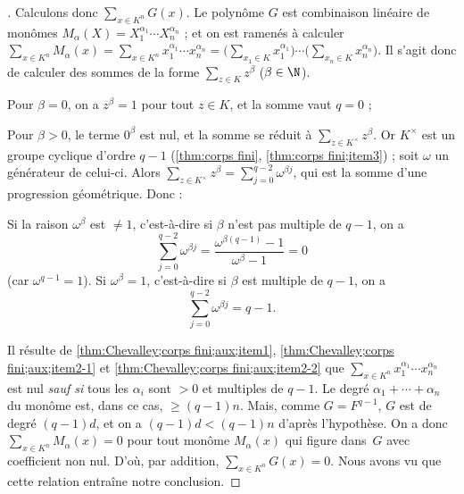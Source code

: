 \documentclass[11pt, useosf,
  title in boldface,
  theorem in new line,
  theorem numbering = section,
  number theorems separately,
]{simplivre}
\begin{document}
\begin{proof}[{Démonstration \cref[de]{thm:Chevalley;corps fini}}]
        Calculons donc \( \sum_{x \in K^n} G(x) \). Le polynôme \( G \) est combinaison linéaire de monômes \( M_{\alpha}(X) = X_1^{\alpha_1} \cdots X_n^{\alpha_n} \) ; et on est ramenés à calculer \( \sum_{x \in K^n} M_{\alpha}(x) = \sum_{x \in K^n} x_1^{\alpha_1} \cdots x_n^{\alpha_n} = \bigl(\sum_{x_1 \in K} x_1^{\alpha_1}\bigr) \cdots \bigl(\sum_{x_n \in K} x_n^{\alpha_n}\bigr) \). Il s'agit donc de calculer des sommes de la forme \( \sum_{z \in K} z^{\beta} \) (\( \beta \in \N \)).
        \begin{enumerate-alph}
            \item \label{thm:Chevalley;corps fini;aux;item1} Pour \( \beta = 0 \), on a \( z^{\beta} = 1 \) pour tout \( z \in K \), et la somme vaut \( q = 0 \) ;
            \item \label{thm:Chevalley;corps fini;aux;item2} Pour \( \beta > 0 \), le terme \( 0^{\beta} \) est nul, et la somme se réduit à \( \sum_{z \in K^\times} z^{\beta} \). Or \( K^\times \) est un groupe cyclique d'ordre \( q-1 \) (\cref{thm:corps fini}, \ref{thm:corps fini;item3}) ; soit \( \omega \) un générateur de celui-ci. Alors \( \sum_{z \in K^\times} z^{\beta} = \sum_{j=0}^{q-2} {\omega}^{\beta j} \), qui est la somme d'une progression géométrique. Donc :
            \begin{enumerate}
                 \label{thm:Chevalley;corps fini;aux;item2-1} Si la raison \( \omega^{\beta} \) est \( \neq 1 \), c'est-à-dire si \( \beta \) n'est pas multiple de \( q-1 \), on a
                \[
                    \sum_{j=0}^{q-2} {\omega}^{\beta j} = \frac{{\omega}^{\beta (q-1)}-1}{{\omega}^{\beta}-1} = 0
                \]
                (car \( \omega^{q-1} = 1 \)).
                 \label{thm:Chevalley;corps fini;aux;item2-2} Si \( \omega^{\beta} = 1 \), c'est-à-dire si \( \beta \) est multiple de \( q-1 \), on a
                \[
                    \sum_{j=0}^{q-2} {\omega}^{\beta j} = q-1.
                \]
            \end{enumerate}
        \end{enumerate-alph}
        Il résulte de \ref{thm:Chevalley;corps fini;aux;item1}, \ref{thm:Chevalley;corps fini;aux;item2-1} et \ref{thm:Chevalley;corps fini;aux;item2-2} que \( \sum_{x \in K^n} x_1^{\alpha_1} \cdots x_n^{\alpha_n} \) est nul \emph{sauf si} tous les \( \alpha_i \) sont \( > 0 \) et multiples de \( q-1 \). Le degré \( \alpha_1 + \cdots + \alpha_n \) du monôme est, dans ce cas, \( \geqslant (q-1)n \). Mais, comme \( G = F^{q-1} \), \( G \) est de degré \( (q-1)d \), et on a \( (q-1)d < (q-1)n \) d'après l'hypothèse. On a donc \( \sum_{x \in K^n} M_{\alpha}(x) = 0 \) pour tout monôme \( M_{\alpha}(x) \) qui figure dans~\( G \) avec coefficient non nul. D'où, par addition, \( \sum_{x \in K^n} G(x) = 0 \). Nous avons vu que cette relation entraîne notre conclusion.
    \end{proof}
\end{document}
